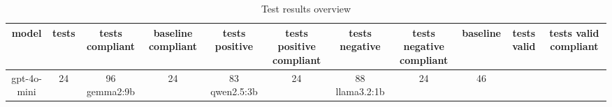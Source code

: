 
  \begin{table}[h!]
  \centering
  \begin{tabular}{|c|c|c|c|c|c|c|c|c|c|c|}
  \hline
  model & tests & tests compliant & baseline compliant & tests positive & tests positive compliant & tests negative & tests negative compliant & baseline & tests valid & tests valid compliant \\
  \hline
  gpt-4o-mini & 24 & 96%
\hline
gemma2:9b & 24 & 83%
\hline
qwen2.5:3b & 24 & 88%
\hline
llama3.2:1b & 24 & 46%
  \end{tabular}
  \caption{Test results overview}
  
  \end{table}
  